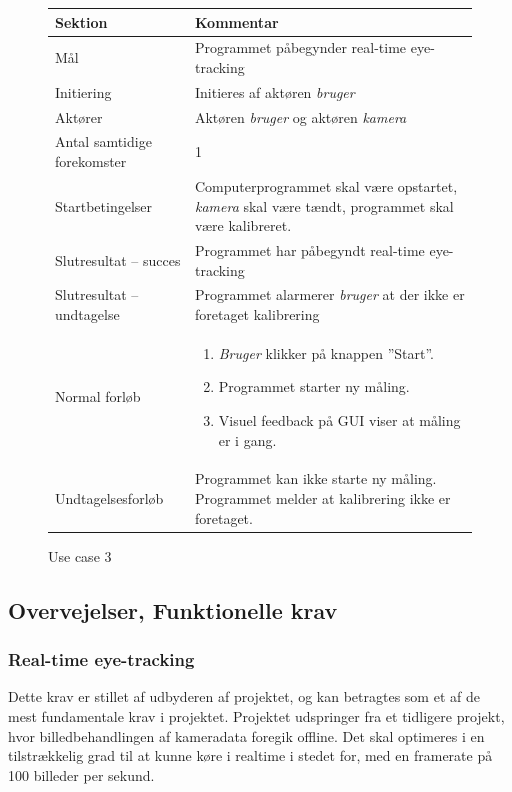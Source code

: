 \documentclass[rapport.tex]{subfiles}
\begin{document}
		\begin{figure}
		\label{fig:UC3}
		\caption{Use case 3}
		\begin{tabular}{|l|p{7.7cm}|}
			\hline \textbf{Sektion} 	& \textbf{Kommentar} \\ 
			\hline Mål  & Programmet påbegynder real-time eye-tracking \\ 
			\hline Initiering  & Initieres af aktøren \textit{bruger} \\ 
			\hline Aktører & Aktøren \textit{bruger} og aktøren \textit{kamera} \\ 
			\hline Antal samtidige forekomster & 1 \\ 
			\hline Startbetingelser & Computerprogrammet skal være opstartet, \textit{kamera} skal være tændt, programmet skal være kalibreret. \\ 
			\hline Slutresultat – succes & Programmet har påbegyndt real-time eye-tracking\\ 
			\hline Slutresultat – undtagelse & Programmet alarmerer \textit{bruger} at der ikke er foretaget kalibrering \\ 
			\hline Normal forløb & \begin{enumerate}
				\item \textit{Bruger} klikker på knappen ”Start”.
				\item Programmet starter ny måling.
				\item Visuel feedback på GUI viser at måling er i gang.
			\end{enumerate} \\  
			\hline Undtagelsesforløb & Programmet kan ikke starte ny måling. Programmet melder
			at kalibrering ikke er foretaget.\\
			\hline 
		\end{tabular}
		\end{figure}
		
	\subsection{Overvejelser, Funktionelle krav}	
	
	\subsubsection{Real-time eye-tracking}
	Dette krav er stillet af udbyderen af projektet, og kan
	betragtes som et af de mest fundamentale krav i projektet. Projektet udspringer fra et tidligere projekt, hvor billedbehandlingen af kameradata foregik offline. Det skal optimeres i en tilstrækkelig grad til at kunne køre i realtime i stedet for, med en framerate på 100 billeder per sekund.
	
\end{document}
